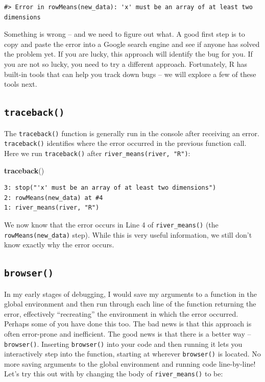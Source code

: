 \documentclass[
]{book}
\newenvironment{Shaded}{\begin{snugshade}}{\end{snugshade}}
\newcommand{\KeywordTok}[1]{\textcolor[rgb]{0.13,0.29,0.53}{\textbf{#1}}}
\newcommand{\NormalTok}[1]{#1}
\begin{document}
\begin{verbatim}
#> Error in rowMeans(new_data): 'x' must be an array of at least two dimensions
\end{verbatim}

Something is wrong -- and we need to figure out what. A good first step is to copy and paste the error into a Google search engine and see if anyone has solved the problem yet. If you are lucky, this approach will identify the bug for you. If you are not so lucky, you need to try a different approach. Fortunately, R has built-in tools that can help you track down bugs -- we will explore a few of these tools next.

\hypertarget{traceback}{%
\subsection{\texorpdfstring{\texttt{traceback()}}{traceback()}}\label{traceback}}

The \texttt{traceback()} function is generally run in the console after receiving an error. \texttt{traceback()} identifies where the error occurred in the previous function call. Here we run \texttt{traceback()} after \texttt{river\_means(river,\ "R")}:

\begin{Shaded}
\begin{Highlighting}[]
\KeywordTok{traceback}\NormalTok{()}
\end{Highlighting}
\end{Shaded}

\begin{verbatim}
3: stop("'x' must be an array of at least two dimensions")
2: rowMeans(new_data) at #4
1: river_means(river, "R")
\end{verbatim}

We now know that the error occurs in Line 4 of \texttt{river\_means()} (the \texttt{rowMeans(new\_data)} step). While this is very useful information, we still don't know exactly why the error occurs.

\hypertarget{browser}{%
\subsection{\texorpdfstring{\texttt{browser()}}{browser()}}\label{browser}}

In my early stages of debugging, I would save my arguments to a function in the global environment and then run through each line of the function returning the error, effectively ``recreating'' the environment in which the error occurred. Perhaps some of you have done this too. The bad news is that this approach is often error-prone and inefficient. The good news is that there is a better way -- \texttt{browser()}. Inserting \texttt{browser()} into your code and then running it lets you interactively step into the function, starting at wherever \texttt{browser()} is located. No more saving arguments to the global environment and running code line-by-line! Let's try this out with by changing the body of \texttt{river\_means()} to be:
\end{document}
